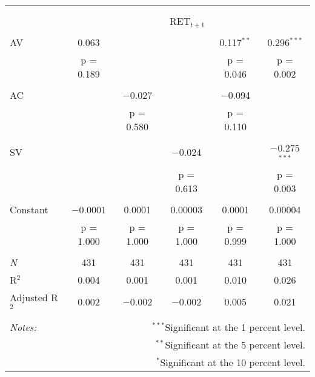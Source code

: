
\begin{tabular}{@{\extracolsep{5pt}}lccccc} 
\\[-1.8ex]\hline 
\hline \\[-1.8ex] 
\\[-1.8ex] & \multicolumn{5}{c}{RET$_{t+1}$} \\ 
\hline \\[-1.8ex] 
 AV & 0.063 &  &  & 0.117$^{**}$ & 0.296$^{***}$ \\ 
  & p = 0.189 &  &  & p = 0.046 & p = 0.002 \\ 
  & & & & & \\ 
 AC &  & $-$0.027 &  & $-$0.094 &  \\ 
  &  & p = 0.580 &  & p = 0.110 &  \\ 
  & & & & & \\ 
 SV &  &  & $-$0.024 &  & $-$0.275$^{***}$ \\ 
  &  &  & p = 0.613 &  & p = 0.003 \\ 
  & & & & & \\ 
 Constant & $-$0.0001 & 0.0001 & 0.00003 & 0.0001 & 0.00004 \\ 
  & p = 1.000 & p = 1.000 & p = 1.000 & p = 0.999 & p = 1.000 \\ 
  & & & & & \\ 
\textit{N} & 431 & 431 & 431 & 431 & 431 \\ 
R$^{2}$ & 0.004 & 0.001 & 0.001 & 0.010 & 0.026 \\ 
Adjusted R$^{2}$ & 0.002 & $-$0.002 & $-$0.002 & 0.005 & 0.021 \\ 
\hline 
\hline \\[-1.8ex] 
\textit{Notes:} & \multicolumn{5}{r}{$^{***}$Significant at the 1 percent level.} \\ 
 & \multicolumn{5}{r}{$^{**}$Significant at the 5 percent level.} \\ 
 & \multicolumn{5}{r}{$^{*}$Significant at the 10 percent level.} \\ 
\end{tabular} 
